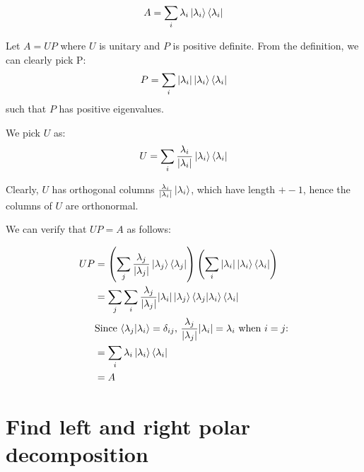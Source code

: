 \documentclass[11pt]{book}
\begin{document}
\begin{align*}
    A = \sum_i \lambda_i \ket{\lambda_i} \bra{\lambda_i}
\end{align*}

Let $A = UP$ where $U$ is unitary and $P$ is positive definite. From the
definition, we can clearly pick P:
\begin{align*}
    P = \sum_i |\lambda_i| \ket{\lambda_i} \bra{\lambda_i}
\end{align*}
such that $P$ has positive eigenvalues.

We pick $U$ as:
\begin{align*}
    U = \sum_i \frac{\lambda_i}{|\lambda_i|} \ket{\lambda_i} \bra{\lambda_i}
\end{align*}

Clearly, $U$ has orthogonal columns $\frac{\lambda_i}{|\lambda_i|} \ket{\lambda_i}$,
which have length $+- 1$, hence the columns of $U$ are orthonormal.

We can verify that $UP = A$ as follows:

\begin{align*}
    UP &= \left( \sum_j \frac{\lambda_j}{|\lambda_j|} \ket{\lambda_j} \bra{\lambda_j} \right)
        \left( \sum_i |\lambda_i| \ket{\lambda_i} \bra{\lambda_i} \right) \\
        &= \sum_j \sum_i \frac{\lambda_j}{|\lambda_j|} |\lambda_i| \ket{\lambda_j} \bra{\lambda_j}  \ket{\lambda_i} \bra{\lambda_i} \\
        &\text{Since $\bra{\lambda_j}\ket{\lambda_i} = \delta_{ij}$, $\frac{\lambda_j}{|\lambda_j|} |\lambda_i| = \lambda_i$ when $i=j$:} \\
        &= \sum_i \lambda_i  \ket{\lambda_i} \bra{\lambda_i} \\
        &= A
\end{align*}

\section{Find left and right polar decomposition}
\end{document}
